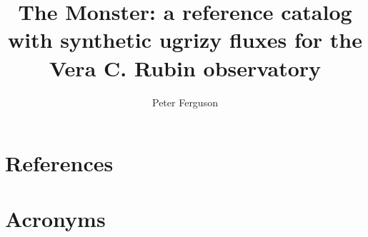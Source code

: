 \documentclass[DM,authoryear,toc]{lsstdoc}
\title{The Monster: a reference catalog with synthetic ugrizy fluxes for the Vera C. Rubin observatory}
\author{%
Peter Ferguson
}
\date{\vcsDate}
\begin{document}
\maketitle


\appendix
\section{References} \label{sec:bib}
\renewcommand{\refname}{} %


\section{Acronyms} \label{sec:acronyms}

\end{document}
